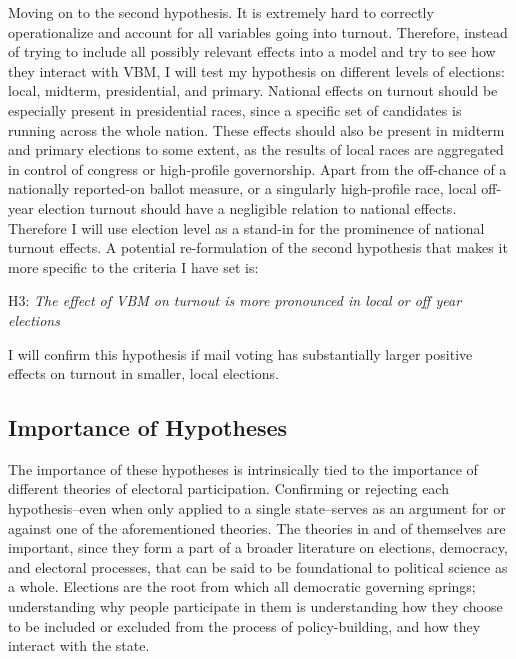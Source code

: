 \documentclass[12pt,twoside]{reedthesis}
\begin{document}
  Moving on to the second hypothesis. It is extremely hard to correctly
  operationalize and account for all variables going into turnout.
  Therefore, instead of trying to include all possibly relevant effects
  into a model and try to see how they interact with VBM, I will test my
  hypothesis on different levels of elections: local, midterm,
  presidential, and primary. National effects on turnout should be
  especially present in presidential races, since a specific set of
  candidates is running across the whole nation. These effects should also
  be present in midterm and primary elections to some extent, as the
  results of local races are aggregated in control of congress or
  high-profile governorship. Apart from the off-chance of a nationally
  reported-on ballot measure, or a singularly high-profile race, local
  off-year election turnout should have a negligible relation to national
  effects. Therefore I will use election level as a stand-in for the
  prominence of national turnout effects. A potential re-formulation of
  the second hypothesis that makes it more specific to the criteria I have
  set is:
  
  \begin{center}    
  H3: \textit{The  effect  of  VBM  on  turnout  is  more  pronounced  in  local  or  off year elections}
  \end{center}
  
  I will confirm this hypothesis if mail voting has substantially larger
  positive effects on turnout in smaller, local elections.
  
  \subsection{Importance of Hypotheses}\label{importance-of-hypotheses}
  
  The importance of these hypotheses is intrinsically tied to the
  importance of different theories of electoral participation. Confirming
  or rejecting each hypothesis--even when only applied to a single
  state--serves as an argument for or against one of the aforementioned
  theories. The theories in and of themselves are important, since they
  form a part of a broader literature on elections, democracy, and
  electoral processes, that can be said to be foundational to political
  science as a whole. Elections are the root from which all democratic
  governing springs; understanding why people participate in them is
  understanding how they choose to be included or excluded from the
  process of policy-building, and how they interact with the state.
  
\end{document}
